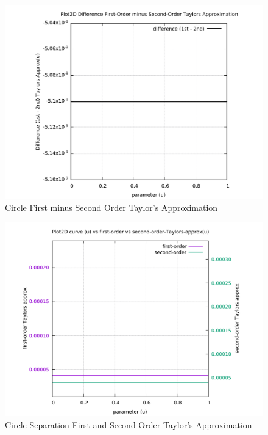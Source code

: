 \begin{figure}
	\caption     {Circle First minus Second Order Taylor's Approximation}
	\label{06-img-Circle-First-minus-Second-Order-Taylors-Approx.pdf}
	\includegraphics[width=1.00\textwidth]{Chap4/appendix/app-Circle/plots/06-img-Circle-First-minus-Second-Order-Taylors-Approx.pdf}
\end{figure}

\clearpage
\pagebreak

\begin{figure}
	\caption     {Circle Separation First and Second Order Taylor's Approximation}
	\label{07-img-Circle-Separation-First-and-Second-Order-Taylors-Approx.pdf}
	\includegraphics[width=1.00\textwidth]{Chap4/appendix/app-Circle/plots/07-img-Circle-Separation-First-and-Second-Order-Taylors-Approx.pdf}
\end{figure}


